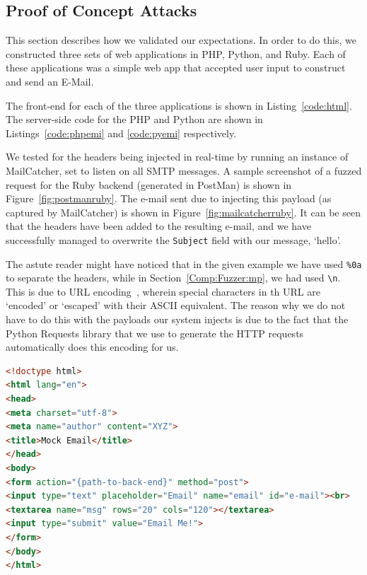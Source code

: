 \subsection*{Proof of Concept Attacks}
This section describes how we validated our expectations. In order to do this, we constructed three sets of web applications in PHP, Python, and Ruby. Each of these applications was a simple web app that accepted user input to construct and send an E-Mail.

The front-end for each of the three applications is shown in Listing~\ref{code:html}. The server-side code for the PHP and Python are shown in Listings~\ref{code:phpemi} and \ref{code:pyemi} respectively.

We tested for the headers being injected in real-time by running an instance of MailCatcher, set to listen on all SMTP messages. A sample screenshot of a fuzzed request for the Ruby backend (generated in PostMan) is shown in Figure~\ref{fig:postmanruby}. The e-mail sent due to injecting this payload (as captured by MailCatcher) is shown in Figure~\ref{fig:mailcatcherruby}. It can be seen that the headers have been added to the resulting e-mail, and we have successfully managed to overwrite the \texttt{Subject} field with our message, `hello'.

The astute reader might have noticed that in the given example we have used \texttt{\%0a} to separate the headers, while in Section~\ref{Comp:Fuzzer:mp}, we had used \texttt{\textbackslash{}n}. This is due to URL encoding~\cite{rfc1738}, wherein special characters in th URL are `encoded' or `escaped' with their ASCII equivalent.
The reason why we do not have to do this with the payloads our system injects is due to the fact that the Python Requests library that we use to generate the HTTP requests automatically does this encoding for us.

\begin{lstlisting}[language=HTML,caption={HTML page for showcasing
      e-mail header injection, a simple front-end for our
      examples.},label={code:html}, float]
<!doctype html>
<html lang="en">
<head>
<meta charset="utf-8">
<meta name="author" content="XYZ">
<title>Mock Email</title>
</head>
<body>
<form action="{path-to-back-end}" method="post">
<input type="text" placeholder="Email" name="email" id="e-mail"><br>
<textarea name="msg" rows="20" cols="120"></textarea>
<input type="submit" value="Email Me!">
</form>
</body>
</html>
\end{lstlisting}

